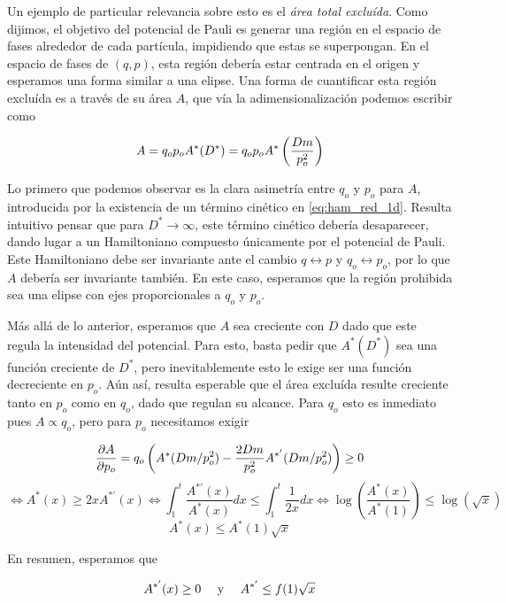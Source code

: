Un ejemplo de particular relevancia sobre esto es el \textit{área total excluída}.
Como dijimos, el objetivo del potencial de Pauli es generar una región en el espacio de fases alrededor de cada partícula, impidiendo que estas se superpongan.
En el espacio de fases de $(q,p)$, esta región debería estar centrada en el origen y esperamos una forma similar a una elipse. 
Una forma de cuantificar esta región excluída es a través de su área $A$, que vía la adimensionalización podemos escribir como 

\begin{equation}{\label{eq:area_red}}
A = q_op_oA^*(D^*) = q_op_oA^*\left( \frac{Dm}{p_o^2} \right) 
\end{equation}

Lo primero que podemos observar es la clara asimetría entre $q_o$ y $p_o$ para $A$, introducida por la existencia de un término cinético en \ref{eq:ham_red_1d}.
Resulta intuitivo pensar que para $D^*\to\infty$, este término cinético debería desaparecer, dando lugar a un Hamiltoniano compuesto únicamente por el potencial de Pauli.
Este Hamiltoniano debe ser invariante ante el cambio $q\leftrightarrow p$ y $q_o\leftrightarrow p_o$, por lo que $A$ debería ser invariante también.
En este caso, esperamos que la región prohibida sea una elipse con ejes proporcionales a $q_o$ y $p_o$.

Más allá de lo anterior, esperamos que $A$ sea creciente con $D$ dado que este regula la intensidad del potencial.
Para esto, basta pedir que $A^*(D^*)$ sea una función creciente de $D^*$, pero inevitablemente esto le exige ser una función decreciente en $p_o$. 
Aún así, resulta esperable que el área excluída resulte creciente tanto en $p_o$ como en $q_o$, dado que regulan su alcance.
Para $q_o$ esto es inmediato pues $A\propto q_o$, pero para $p_o$ necesitamos exigir

\[ \frac{\partial A}{\partial p_o} = q_o\left( A^*(Dm/p_o^2) - \frac{2Dm}{p_o^2}A^{*'}(Dm/p_o^2) \right) \geq 0\]
\[ \Longleftrightarrow A^*(x) \geq 2x A^{*'}(x) \Longleftrightarrow  \int_1^t \frac{A^{*'}(x)}{A^*(x)}dx \leq \int_1^t\frac{1}{2x}dx \Longleftrightarrow \log{\left(\frac{A^*(x)}{A^*(1)}\right)} \leq \log{(\sqrt{x})} \]
\[ A^*(x) \leq A^*(1) \sqrt{x}\]

En resumen, esperamos que

\begin{equation}{\label{eq:props_area_red}}
A^{*'}(x)\geq 0 \quad \text{ y } \quad A^{*'}\leq f(1)\sqrt{x} 
\end{equation}



